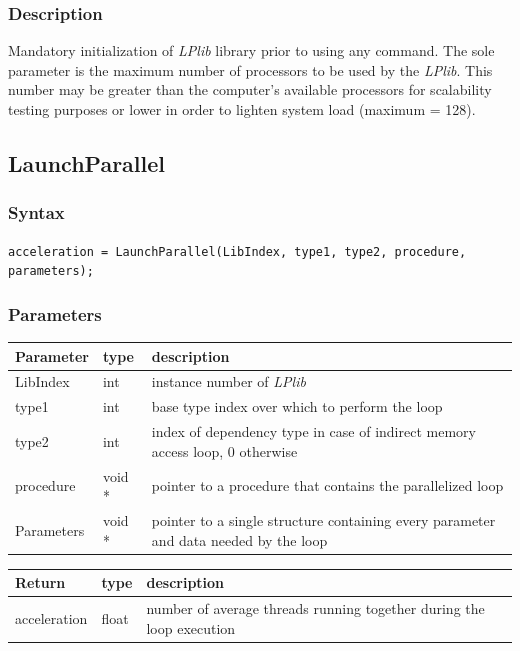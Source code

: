 \documentclass[a4paper,12pt]{article}
\begin{document}
\subsubsection*{Description}
Mandatory initialization of \emph{LPlib} library prior to using any command. The sole parameter is the maximum number of processors to be used by the \emph{LPlib}. This number may be greater than the computer's available processors for scalability testing purposes or lower in order to lighten system load (maximum = 128).


\subsection{LaunchParallel}

\subsubsection*{Syntax}
\tt{acceleration = LaunchParallel(LibIndex, type1, type2, procedure, parameters);}
\normalfont

\subsubsection*{Parameters}
\begin{tabular}{|m{2cm}|m{1.5cm}|m{10.5cm}|}
\hline
Parameter  & type   & description \\
\hline
LibIndex   & int    & instance number of \emph{LPlib} \\
\hline
type1      & int    & base type index over which to perform the loop \\
\hline
type2      & int    & index of dependency type in case of indirect memory access loop, 0 otherwise \\
\hline
procedure  & void * & pointer to a procedure that contains the parallelized loop \\
\hline
Parameters & void * & pointer to a single structure containing every parameter and data needed by the loop \\
\hline
\end{tabular}

\medskip

\noindent
\begin{tabular}{|m{2cm}|m{1.5cm}|m{10.5cm}|}
\hline
Return     & type   & description \\
\hline
acceleration & float & number of average threads running together during the loop execution \\
\hline
\end{tabular}
\end{document}
